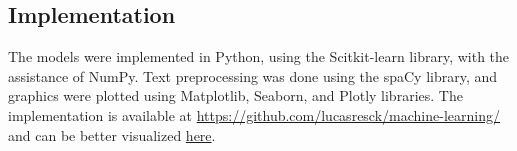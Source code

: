 \subsection{Implementation}

    The models were implemented in Python, using the Scitkit-learn library, with the assistance of NumPy. Text preprocessing was done using the spaCy library, and graphics were plotted using Matplotlib, Seaborn, and Plotly libraries. The implementation is available at \href{https://github.com/lucasresck/machine-learning/}{https://github.com/lucasresck/machine-learning/} and can be better visualized \href{https://nbviewer.jupyter.org/github/lucasresck/machine-learning/blob/main/notebooks/a2_assignment.ipynb}{here}.
